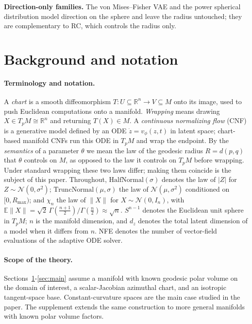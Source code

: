 \documentclass{article}
\newcommand{\E}{\mathbb{E}}
\theoremstyle{definition}
\theoremstyle{remark}
\newcommand{\RR}{\mathbb{R}}
\begin{document}
\textbf{Direction-only families.} The von Mises--Fisher VAE \citep{davidson2018hyperspherical} and the power spherical distribution \citep{decao2020power} model direction on the sphere and leave the radius untouched; they are complementary to RC, which controls the radius only.


\section{Background and notation}
\label{sec:background}
\paragraph{Terminology and notation.}
A \emph{chart} is a smooth diffeomorphism $T:U\subseteq\RR^n\to V\subseteq M$ onto its image, used to push Euclidean computations onto a manifold. \emph{Wrapping} means drawing $X\in T_pM\cong\RR^n$ and returning $T(X)\in M$. A \emph{continuous normalizing flow} (CNF) is a generative model defined by an ODE $\dot z = v_\phi(z,t)$ in latent space; chart-based manifold CNFs run this ODE in $T_pM$ and wrap the endpoint. By the \emph{semantics} of a parameter $\theta$ we mean the law of the geodesic radius $R=d(p,q)$ that $\theta$ controls on $M$, as opposed to the law it controls on $T_pM$ before wrapping. Under standard wrapping these two laws differ; making them coincide is the subject of this paper. Throughout, $\mathrm{HalfNormal}(\sigma)$ denotes the law of $|Z|$ for $Z\sim\mathcal N(0,\sigma^2)$; $\mathrm{TruncNormal}(\mu,\sigma)$ the law of $\mathcal N(\mu,\sigma^2)$ conditioned on $[0,R_{\max})$; and $\chi_n$ the law of $\|X\|$ for $X\sim\mathcal N(0,I_n)$, with $\E\|X\|=\sqrt2\,\Gamma(\tfrac{n+1}{2})/\Gamma(\tfrac n2)\approx\sqrt n$. $S^{n-1}$ denotes the Euclidean unit sphere in $T_pM$; $n$ is the manifold dimension, and $d_z$ denotes the total latent dimension of a model when it differs from $n$. NFE denotes the number of vector-field evaluations of the adaptive ODE solver.

\paragraph{Scope of the theory.}
Sections~\ref{sec:background}-\ref{sec:main} assume a manifold with known geodesic polar volume on the domain of interest, a scalar-Jacobian azimuthal chart, and an isotropic tangent-space base. Constant-curvature spaces are the main case studied in the paper. The supplement extends the same construction to more general manifolds with known polar volume factors.
\end{document}
